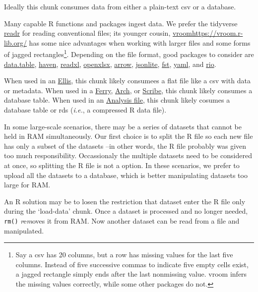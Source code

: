 \documentclass[
]{book}
\begin{document}
Ideally this chunk consumes data from either a plain-text csv or a database.

Many capable R functions and packages ingest data. We prefer the tidyverse \href{https://readr.tidyverse.org/}{readr} for reading conventional files; its younger cousin, \href{}{vroom}\url{https://vroom.r-lib.org/} has some nice advantages when working with larger files and some forms of jagged rectangles\footnote{Say a csv has 20 columns, but a row has missing values for the last five columns. Instead of five successive commas to indicate five empty cells exist, a jagged rectangle simply ends after the last nonmissing value. vroom infers the missing values correctly, while some other packages do not.}. Depending on the file format, good packages to consider are \href{https://cran.r-project.org/package=data.table}{data.table}, \href{https://haven.tidyverse.org/}{haven}, \href{https://readxl.tidyverse.org/}{readxl}, \href{https://ycphs.github.io/openxlsx/}{openxlsx}, \href{https://CRAN.R-project.org/package=arrow}{arrow}, \href{https://CRAN.R-project.org/package=jsonlite}{jsonlite}, \href{http://www.fstpackage.org/}{fst}, \href{https://CRAN.R-project.org/package=yaml}{yaml}, and \href{https://cloud.r-project.org/web/packages/rio/vignettes/rio.html}{rio}.

When used in an \protect\hyperlink{pattern-ellis}{Ellis}, this chunk likely consumees a flat file like a csv with data or metadata. When used in a \protect\hyperlink{pattern-ferry}{Ferry}, \protect\hyperlink{pattern-arch}{Arch}, or \protect\hyperlink{pattern-scribe}{Scribe}, this chunk likely consumes a database table. When used in an \protect\hyperlink{pattern-analysis}{Analysis file}, this chunk likely cosumes a database table or rds (\emph{i.e.}, a compressed R data file).

In some large-scale scenarios, there may be a series of datasets that cannot be held in RAM simultaneously. Our first choice is to split the R file so each new file has only a subset of the datasets --in other words, the R file probably was given too much responsibility. Occassionaly the multiple datasets need to be considered at once, so splitting the R file is not a option. In these scenarios, we prefer to upload all the datasets to a database, which is better manipulating datasets too large for RAM.

An R solution may be to losen the restriction that dataset enter the R file only during the `load-data' chunk. Once a dataset is processed and no longer needed, \texttt{rm()} \emph{r}e\emph{m}oves it from RAM. Now another dataset can be read from a file and manipulated.
\end{document}
